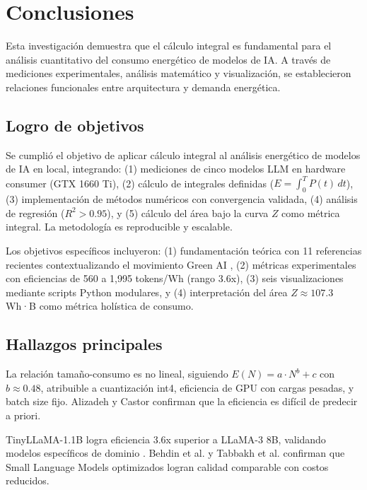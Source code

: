 \clearpage
\section{Conclusiones}

Esta investigación demuestra que el cálculo integral es fundamental para el análisis cuantitativo del consumo energético de modelos de IA. A través de mediciones experimentales, análisis matemático y visualización, se establecieron relaciones funcionales entre arquitectura y demanda energética.

\subsection{Logro de objetivos}

Se cumplió el objetivo de aplicar cálculo integral al análisis energético de modelos de IA en local, integrando: (1) mediciones de cinco modelos LLM en hardware consumer (GTX 1660 Ti), (2) cálculo de integrales definidas ($E = \int_0^T P(t) \, dt$), (3) implementación de métodos numéricos con convergencia validada, (4) análisis de regresión ($R^2 > 0.95$), y (5) cálculo del área bajo la curva $Z$ como métrica integral. La metodología es reproducible y escalable.

Los objetivos específicos incluyeron: (1) fundamentación teórica con 11 referencias recientes contextualizando el movimiento Green AI \cite{schwartz2019green, greensoftware2025position}, (2) métricas experimentales con eficiencias de 560 a 1,995 tokens/Wh (rango 3.6x), (3) seis visualizaciones mediante scripts Python modulares, y (4) interpretación del área $Z \approx 107.3$ Wh·B como métrica holística de consumo.

\subsection{Hallazgos principales}

La relación tamaño-consumo es no lineal, siguiendo $E(N) = a \cdot N^b + c$ con $b \approx 0.48$, atribuible a cuantización int4, eficiencia de GPU con cargas pesadas, y batch size fijo. Alizadeh y Castor \cite{alizadeh2024green} confirman que la eficiencia es difícil de predecir a priori.

TinyLLaMA-1.1B logra eficiencia 3.6x superior a LLaMA-3 8B, validando modelos específicos de dominio \cite{chatterjee2025energy}. Behdin et al. \cite{behdin2025scaling} y Tabbakh et al. \cite{tabbakh2024sustainable} confirman que Small Language Models optimizados logran calidad comparable con costos reducidos.

